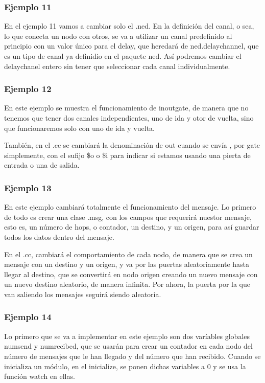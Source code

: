 \documentclass{article}
\begin{document}
		\subsubsection{Ejemplo 11}
		
		En el ejemplo 11 vamos a cambiar solo el .ned. En la definición del canal, o sea, lo que conecta un nodo con otros, se va a utilizar un canal predefinido al principio con un valor único para el delay, que heredará de ned.delaychannel, que es un tipo de canal ya definidio en el paquete ned. Así podremos cambiar el delaychanel entero sin tener que seleccionar cada canal individualmente.
		
		\subsubsection{Ejemplo 12}
		
		En este ejemplo se muestra el funcionamiento de inoutgate, de manera que no tenemos que tener dos canales independientes, uno de ida y otor de vuelta, sino que funcionaremos solo con uno de ida y vuelta.
		
		También, en el .cc se cambiará la denominación de out cuando se envía , por gate simplemente, con el sufijo \$o o \$i para indicar si estamos usando una pierta de entrada o una de salida.
		
		\subsubsection{Ejemplo 13}
		
		En este ejemplo cambiará totalmente el funcionamiento del mensaje. Lo primero de todo es crear una clase .msg, con los campos que requerirá nuestor mensaje, esto es, un número de hops, o contador, un destino, y un origen, para así guardar todos los datos dentro del  mensaje.
		
		En el .cc, cambiará el comportamiento de cada nodo, de manera que se crea un mensaje con un destino y un origen, y va por las puertas aleatoriamente hasta llegar al destino, que se convertirá en nodo origen creando un nuevo mensaje con un nuevo destino aleatorio, de manera infinita. Por ahora, la puerta por la que van saliendo los mensajes seguirá siendo aleatoria.
		
		\subsubsection{Ejemplo 14}
		
		Lo primero que se va a implementar en este ejemplo son dos varíables globales numsend y numrecibed, que se usarán para crear un contador en cada nodo del número de mensajes que le han llegado y del número que han recibido.
		Cuando se inicializa un módulo, en el inicialize, se ponen dichas variables a 0 y se usa la función watch en ellas.
		
\end{document}
